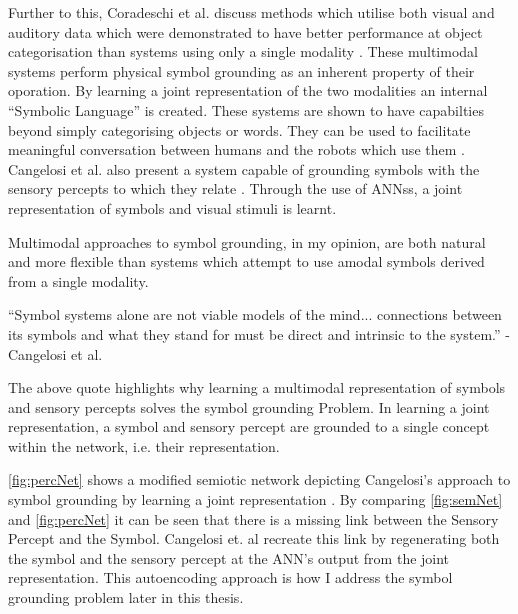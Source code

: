 Further to this, Coradeschi et al. discuss methods which utilise both visual and auditory data which were demonstrated to have better performance at object categorisation than systems using only a single modality \cite{coradeschi2013short}. These multimodal systems perform physical symbol grounding as an inherent property of their oporation. By learning a joint representation of the two modalities an internal ``Symbolic Language'' is created. These systems are shown to have capabilties beyond simply categorising objects or words. They can be used to facilitate meaningful conversation between humans and the robots which use them \cite{nakamura2009grounding, nakamura2011grounding}. Cangelosi et al. also present a system capable of grounding symbols with the sensory percepts to which they relate \cite{cangelosi2000robotic}. Through the use of \acp{ANN}s, a joint representation of symbols and visual stimuli is learnt.

Multimodal approaches to symbol grounding, in my opinion, are both natural and more flexible than systems which attempt to use amodal symbols derived from a single modality.

\begin{displayquote}
``Symbol systems alone are not viable models of the mind... connections between its symbols and what they stand for must be direct and intrinsic to the system.'' - Cangelosi et al.
\end{displayquote}

The above quote highlights why learning a multimodal representation of symbols and sensory percepts solves the symbol grounding Problem. In learning a joint representation, a symbol and sensory percept are grounded to a single concept within the network, i.e. their representation.

\autoref{fig:percNet} shows a modified semiotic network depicting Cangelosi's approach to symbol grounding by learning a joint representation \cite{cangelosi2000robotic}. By comparing \autoref{fig:semNet} and \autoref{fig:percNet} it can be seen that there is a missing link between the Sensory Percept and the Symbol. Cangelosi et. al recreate this link by regenerating both the symbol and the sensory percept at the \ac{ANN}'s output from the joint representation. This autoencoding approach is how I address the symbol grounding problem later in this thesis.


